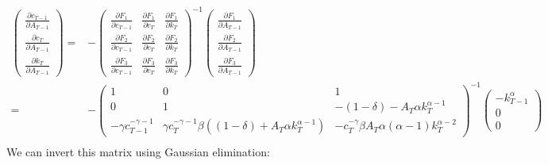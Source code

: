 \documentclass[12pt,reqno]{amsart}
\theoremstyle{definition}
\begin{document}
\begin{align*}
  \begin{pmatrix} \frac{\partial c_{T-1}}{\partial A_{T-1}} \\ 
    \frac{\partial c_{T}} {\partial A_{T-1}} \\ 
    \frac{\partial
      k_{T}} {\partial A_{T-1}} \end{pmatrix} = & 
  -\begin{pmatrix} 
    \frac{\partial F_1}{\partial c_{T-1}} & 
    \frac{\partial F_1}{\partial c_{T}} & 
    \frac{\partial F_1}{\partial k_{T}} \\
    \frac{\partial F_2}{\partial c_{T-1}} & 
    \frac{\partial F_2}{\partial c_{T}} & 
    \frac{\partial F_2}{\partial k_{T}} \\
    \frac{\partial F_3}{\partial c_{T-1}} & 
    \frac{\partial F_3}{\partial c_{T}} & 
    \frac{\partial F_3}{\partial k_{T}} 
  \end{pmatrix}^{-1} \begin{pmatrix} 
    \frac{\partial F_1}{\partial A_{T-1}} \\     
    \frac{\partial F_2}{\partial A_{T-1}} \\
    \frac{\partial F_3}{\partial A_{T-1}} 
  \end{pmatrix} \\
  = & 
  -\begin{pmatrix} 
    1 & 0 & 1 \\
    0 & 1 & -(1-\delta) - A_T\alpha k_T^{\alpha-1} \\
    -\gamma c_{T-1}^{-\gamma-1} & \gamma c_{T}^{-\gamma-1}
    \beta\left((1-\delta) + A_T \alpha k_T^{\alpha-1}\right) &
    -c_T^{-\gamma} \beta A_T \alpha (\alpha-1) k_T^{\alpha-2} 
  \end{pmatrix}^{-1} 
  \begin{pmatrix}
    -k_{T-1}^\alpha \\
    0 \\
    0
  \end{pmatrix} \\
\end{align*}
We can invert this matrix using Gaussian elimination:
\end{document}

